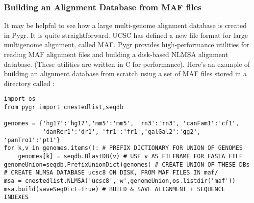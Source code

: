 \documentclass{howto}
\begin{document}
\subsubsection{Building an Alignment Database from MAF files}
It may be helpful to see how a large multi-genome alignment database
is created in Pygr.  It is quite straightforward.
UCSC has defined a new file format for large multigenome alignment,
called MAF.  Pygr provides high-performance utilities for reading
MAF alignment files and building a disk-based NLMSA alignment database.
(These utilities are written in C for performance).  Here's an
example of building an alignment database from scratch using a
set of MAF files stored in a directory called :

\begin{verbatim}
import os
from pygr import cnestedlist,seqdb

genomes = {'hg17':'hg17','mm5':'mm5', 'rn3':'rn3', 'canFam1':'cf1', 
           'danRer1':'dr1', 'fr1':'fr1','galGal2':'gg2', 'panTro1':'pt1'}
for k,v in genomes.items(): # PREFIX DICTIONARY FOR UNION OF GENOMES
    genomes[k] = seqdb.BlastDB(v) # USE v AS FILENAME FOR FASTA FILE
genomeUnion=seqdb.PrefixUnionDict(genomes) # CREATE UNION OF THESE DBs
# CREATE NLMSA DATABASE ucsc8 ON DISK, FROM MAF FILES IN maf/
msa = cnestedlist.NLMSA('ucsc8','w',genomeUnion,os.listdir('maf'))
msa.build(saveSeqDict=True) # BUILD & SAVE ALIGNMENT + SEQUENCE INDEXES
\end{verbatim}
\end{document}
